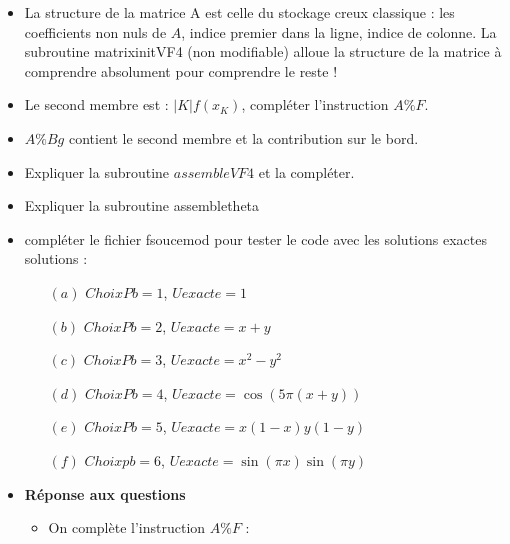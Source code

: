 \documentclass[11pt,a4paper]{scrartcl}%
\theoremstyle{plain}
\theoremstyle{definition}
\theoremstyle{remark}
\begin{document}
\begin{itemize}
\begin{itemize}
	\item La structure de la matrice A est celle du stockage creux classique : les coefficients non
nuls de $A$, indice premier dans la ligne, indice de colonne. La subroutine matrixinitVF4 (non
modifiable) alloue la structure de la matrice à comprendre absolument pour comprendre le
reste !
	\item Le second membre est : $|K|f (x_K )$, compléter l’instruction $A\%F$. 
   	\item $A\%Bg$ contient le second membre et la contribution sur le bord.
	\item Expliquer la subroutine $assembleVF4$ et la compléter.
	\item Expliquer la subroutine assembletheta
	\item compléter le fichier fsoucemod pour tester le code avec les solutions exactes solutions :
		\begin{itemize}
			\item[$(a)$] $ChoixPb = 1$, $Uexacte = 1$
			\item[$(b)$] $ChoixPb = 2$, $Uexacte = x + y$
			\item[$(c)$] $ChoixPb = 3$, $Uexacte = x^2 - y^2$
			\item[$(d)$] $ChoixPb = 4$, $Uexacte = \cos(5\pi(x + y))$
			\item[$(e)$] $ChoixPb = 5$, $Uexacte = x(1 - x)y(1 - y)$
			\item[$(f)$] $Choixpb = 6$, $Uexacte = \sin(\pi x)\sin(\pi y)$
		\end{itemize}
	\item \textbf{Réponse aux questions}
		\begin{itemize}
			\item On complète l'instruction $A\%F$ :\\
			

\end{itemize}
\end{itemize}
\end{itemize}
\end{document}
